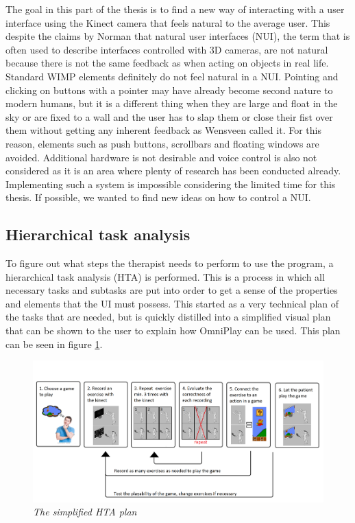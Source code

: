 The goal in this part of the thesis is to find a new way of interacting with a user interface using the Kinect camera that feels natural to the average user. This despite the claims by Norman \cite{Norman2010} that natural user interfaces (NUI), the term that is often used to describe interfaces controlled with 3D cameras, are not natural because there is not the same feedback as when acting on objects in real life. Standard WIMP elements definitely do not feel natural in a NUI. Pointing and clicking on buttons with a pointer may have already become second nature to modern humans, but it is a different thing when they are large and float in the sky or are fixed to a wall and the user has to slap them or close their fist over them without getting any inherent feedback as Wensveen \cite{Wensveen2004} called it. For this reason, elements such as push buttons, scrollbars and floating windows are avoided. Additional hardware is not desirable and voice control is also not considered as it is an area where plenty of research has been conducted already. Implementing such a system is impossible considering the limited time for this thesis. If possible, we wanted to find new ideas on how to control a NUI.


\subsection{Hierarchical task analysis}

To figure out what steps the therapist needs to perform to use the program, a hierarchical task analysis (HTA) is performed. This is a process in which all necessary tasks and subtasks are put into order to get a sense of the properties and elements that the UI must possess. This started as a very technical plan of the tasks that are needed, but is quickly distilled into a simplified visual plan that can be shown to the user to explain how OmniPlay can be used. This plan can be seen in figure \ref{HTA}.

\begin{figure}[H]
	\begin{center}
		\includegraphics[width=14cm]{figures/HTA_plan.png}
		\caption{\emph{The simplified HTA plan}}
		\label{HTA}
	\end{center}
\end{figure}


